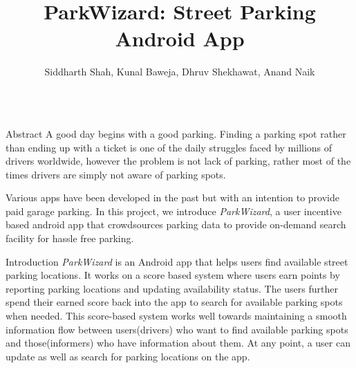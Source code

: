 \documentclass[final]{beamer}
\title{ParkWizard: Street Parking Android App} %
\author{Siddharth Shah, Kunal Baweja, Dhruv Shekhawat, Anand Naik} %
\newlength{\onecolwid}
\begin{document}


\begin{frame}[t] %

\begin{columns}[t] %

\begin{column}{\onecolwid} %

\begin{alertblock}{Abstract}
\fontsize{34}{40} \selectfont A good day begins with a good parking. Finding a parking spot rather than ending up with a ticket is one of the daily struggles faced by millions of drivers worldwide, however the problem is not lack of parking, rather most of the times drivers are simply not aware of parking spots.\par
Various apps have been developed in the past but with an intention to provide paid garage parking. In this project, we introduce \textit{ParkWizard}, a user incentive based android app that crowdsources parking data to provide on-demand search facility for hassle free parking.
\end{alertblock}


\begin{block}{Introduction}
\fontsize{34}{40} \selectfont \textit{ParkWizard} is an Android app that helps users find available street parking locations. It works on a score based system where users earn points by reporting parking locations and updating availability status. The users further spend their earned score back into the app to search for available parking spots when needed. This score-based system works well towards maintaining a smooth information flow between users(drivers) who want to find available parking spots and those(informers) who have information about them. At any point, a user can update as well as search for parking locations on the app.\par
\end{block}


\end{column}
\end{columns}
\end{frame}
\end{document}
